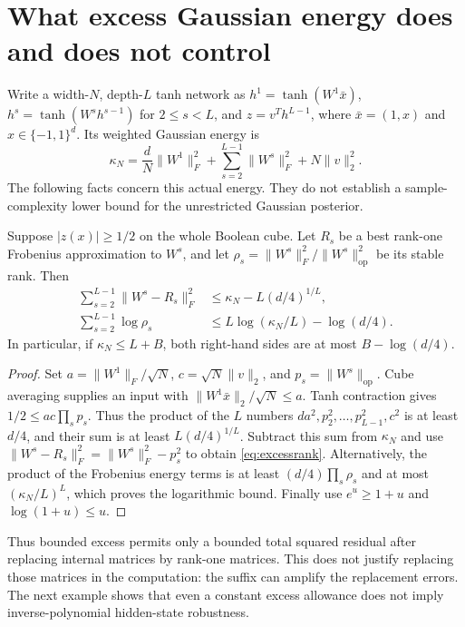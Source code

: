 \section{What excess Gaussian energy does and does not control}
\label{app:excessenergy}

Write a width-$N$, depth-$L$ tanh network as
$h^1=\tanh(W^1\bar x)$, $h^s=\tanh(W^sh^{s-1})$ for $2\le s<L$,
and $z=v^Th^{L-1}$, where $\bar x=(1,x)$ and $x\in\{-1,1\}^d$.
Its weighted Gaussian energy is
\[
 \kappa_N=\frac dN\|W^1\|_F^2+
       \sum_{s=2}^{L-1}\|W^s\|_F^2+N\|v\|_2^2.
\]
The following facts concern this actual energy. They do not establish a
sample-complexity lower bound for the unrestricted Gaussian posterior.

\begin{proposition}
Suppose $|z(x)|\ge1/2$ on the whole Boolean cube. Let $R_s$ be a best
rank-one Frobenius approximation to $W^s$, and let
$\rho_s=\|W^s\|_F^2/\|W^s\|_{\mathrm{op}}^2$ be its stable rank.
Then
\begin{align}
 \sum_{s=2}^{L-1}\|W^s-R_s\|_F^2
 &\le \kappa_N-L(d/4)^{1/L},\label{eq:excessrank}\\
 \sum_{s=2}^{L-1}\log\rho_s
 &\le L\log(\kappa_N/L)-\log(d/4).
\end{align}
In particular, if $\kappa_N\le L+B$, both right-hand sides are at most
$B-\log(d/4)$.
\end{proposition}

\begin{proof}
Set $a=\|W^1\|_F/\sqrt N$, $c=\sqrt N\|v\|_2$, and
$p_s=\|W^s\|_{\mathrm{op}}$. Cube averaging supplies an input with
$\|W^1\bar x\|_2/\sqrt N\le a$. Tanh contraction gives
$1/2\le ac\prod_s p_s$. Thus the product of the $L$ numbers
$da^2,p_2^2,\ldots,p_{L-1}^2,c^2$ is at least $d/4$, and their sum is at
least $L(d/4)^{1/L}$. Subtract this sum from $\kappa_N$ and use
$\|W^s-R_s\|_F^2=\|W^s\|_F^2-p_s^2$ to obtain
\eqref{eq:excessrank}. Alternatively, the product of the Frobenius energy
terms is at least $(d/4)\prod_s\rho_s$ and at most $(\kappa_N/L)^L$,
which proves the logarithmic bound. Finally use $e^u\ge1+u$ and
$\log(1+u)\le u$.
\end{proof}

Thus bounded excess permits only a bounded total squared residual after
replacing internal matrices by rank-one matrices. This does not justify
replacing those matrices in the computation: the suffix can amplify the
replacement errors. The next example shows that even a constant excess
allowance does not imply inverse-polynomial hidden-state robustness.

